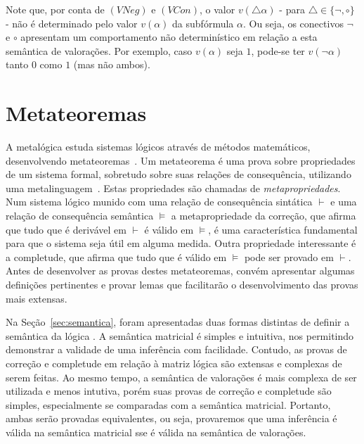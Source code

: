         Note que, por conta de $(VNeg)$ e $(VCon)$, o valor $v(\triangle \alpha)$ {-} para $\triangle \in \{\neg, \circ\}$ {-} não é determinado pelo valor $v(\alpha)$ da subfórmula $\alpha$. Ou seja, os conectivos $\neg$ e $\circ$ apresentam um comportamento não determinístico em relação a esta semântica de valorações. Por exemplo, caso $v(\alpha)$ seja $1$, pode-se ter $v(\neg \alpha)$ tanto $0$ como $1$ (mas não ambos).


                
\section{Metateoremas}\label{sec:metateoremas}
  A metalógica estuda sistemas lógicos através de métodos matemáticos, desenvolvendo metateoremas~\cite{Jacquette2002-JACACT-7}. Um metateorema é uma prova sobre propriedades de um sistema formal, sobretudo sobre suas relações de consequência, utilizando uma metalinguagem~\cite{Tarski1956-TARLSM,Barile_2024}. Estas propriedades são chamadas de \textit{metapropriedades}. Num sistema lógico munido com uma relação de consequência sintática $\vdash$ e uma relação de consequência semântica $\vDash$ a metapropriedade da correção, que afirma que tudo que é derivável em $\vdash$ é válido em $\vDash$, é uma característica fundamental para que o sistema seja útil em alguma medida. Outra propriedade interessante é a completude, que afirma que tudo que é válido em $\vDash$ pode ser provado em $\vdash$. Antes de desenvolver as provas destes metateoremas, convém apresentar algumas definições pertinentes e provar lemas que facilitarão o desenvolvimento das provas mais extensas.

    Na Seção~\ref{sec:semantica}, foram apresentadas duas formas distintas de definir a semântica da lógica \lfium{}. A semântica matricial é simples e intuitiva, nos permitindo demonstrar a validade de uma inferência com facilidade. Contudo, as provas de correção e completude em relação à matriz lógica são extensas e complexas de serem feitas. Ao mesmo tempo, a semântica de valorações é mais complexa de ser utilizada e menos intutiva, porém suas provas de correção e completude são simples, especialmente se comparadas com a semântica matricial. Portanto, ambas serão provadas equivalentes, ou seja, provaremos que uma inferência é válida na semântica matricial sse é válida na semântica de valorações. 
    
